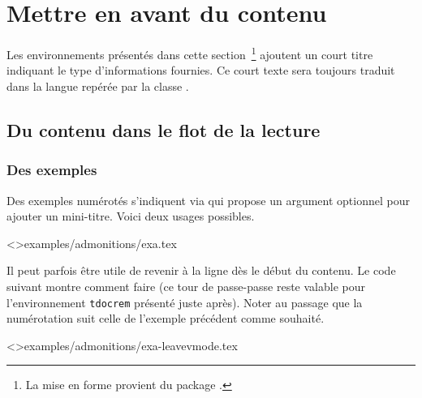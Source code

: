 \documentclass{tutodoc}
\begin{document}
\section{Mettre en avant du contenu}

\begin{tdocnote}
    Les environnements présentés dans cette section\,%
    \footnote{
        La mise en forme provient du package .
    }
    ajoutent un court titre indiquant le type d'informations fournies.
    Ce court texte sera toujours traduit dans la langue repérée par la classe \thisproj.
\end{tdocnote}



\subsection{Du contenu dans le flot de la lecture}




\subsubsection{Des exemples}

Des exemples numérotés s'indiquent via  qui propose un argument optionnel pour ajouter un mini-titre.
Voici deux usages possibles.

\tdoclatexinput<>{examples/admonitions/exa.tex}


\begin{tdoctip}
    Il peut parfois être utile de revenir à la ligne dès le début du contenu. Le code suivant montre comment faire (ce tour de passe-passe reste valable pour l'environnement \verb#tdocrem# présenté juste après). Noter au passage que la numérotation suit celle de l'exemple précédent comme souhaité.
\end{tdoctip}

\tdoclatexinput<>{examples/admonitions/exa-leavevmode.tex}
\end{document}
